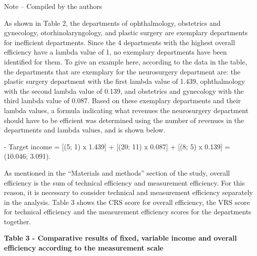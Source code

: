 Note -- Compiled by the authors

\begin{multicols}{2}
As shown in Table 2, the departments of ophthalmology, obstetrics and
gynecology, otorhinolaryngology, and plastic surgery are exemplary
departments for inefficient departments. Since the 4 departments with
the highest overall efficiency have a lambda value of 1, no exemplary
departments have been identified for them. To give an example here,
according to the data in the table, the departments that are exemplary
for the neurosurgery department are: the plastic surgery department with
the first lambda value of 1.439, ophthalmology with the second lambda
value of 0.139, and obstetrics and gynecology with the third lambda
value of 0.087. Based on these exemplary departments and their lambda
values, a formula indicating what revenues the neurosurgery department
should have to be efficient was determined using the number of revenues
in the departments and lambda values, and is shown below.

- Target income = {[}(5; 1) x 1.439{]} + {[}(20; 11) x 0.087{]} + {[}(8;
5) x 0.139{]} = (10.046; 3.091).

As mentioned in the ``Materials and methods'' section of the study,
overall efficiency is the sum of technical efficiency and measurement
efficiency. For this reason, it is necessary to consider technical and
measurement efficiency separately in the analysis. Table 3 shows the CRS
score for overall efficiency, the VRS score for technical efficiency and
the measurement efficiency scores for the departments together.
\end{multicols}

{\bfseries Table 3 - Comparative results of fixed, variable income and
overall efficiency according to the measurement scale}

